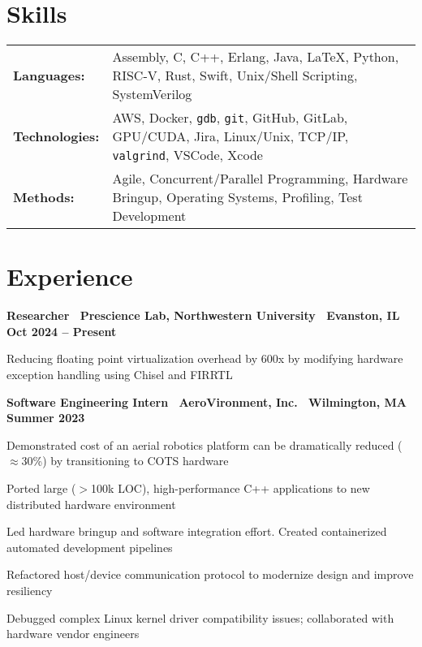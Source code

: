 \documentclass[10pt]{article}
\newenvironment{mylist}[1][]
{\itemize[nosep, wide=0pt, leftmargin=*, after=\strut]}
{\enditemize}
\begin{document}
\section{Skills}
\begin{tabularx}{\linewidth}{@{}l X@{}}
    \textbf{Languages:} & Assembly, C, C++, Erlang, Java, \LaTeX, Python, RISC-V, Rust, Swift, Unix/Shell Scripting, SystemVerilog \\
    \textbf{Technologies:} & AWS, Docker, \texttt{gdb}, \texttt{git}, GitHub, GitLab, GPU/CUDA, Jira, Linux/Unix, TCP/IP, \texttt{valgrind}, VSCode, Xcode \\
    \textbf{Methods:} & Agile, Concurrent/Parallel Programming, Hardware Bringup, Operating Systems, Profiling, Test Development
\end{tabularx}


\section{Experience}
\begin{minipage}[t]{\linewidth}
    \textbf{Researcher \textbar \ Prescience Lab, Northwestern University \textbar \ Evanston, IL} \hfill \textbf{Oct 2024 -- Present} 
    \begin{mylist}
        \item Reducing floating point virtualization overhead by 600x by modifying hardware exception handling using Chisel and FIRRTL
    \end{mylist}
\end{minipage}

\begin{minipage}[t]{\linewidth}
    \textbf{Software Engineering Intern \textbar \ AeroVironment, Inc. \textbar \ Wilmington, MA} \hfill \textbf{Summer 2023} 
    \begin{mylist}
        \item Demonstrated cost of an aerial robotics platform can be dramatically reduced ($\approx$30\%) by transitioning to COTS hardware
        \item Ported large ($>$100k LOC), high-performance C++ applications to new distributed hardware environment
        \item Led hardware bringup and software integration effort. Created containerized automated development pipelines
        \item Refactored host/device communication protocol to modernize design and improve resiliency
        \item Debugged complex Linux kernel driver compatibility issues; collaborated with hardware vendor engineers
    \end{mylist}
\end{minipage}
\end{document}
